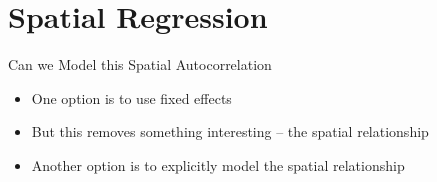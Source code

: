 \documentclass[aspectratio = 169, 12pt]{beamer}\usepackage[]{graphicx}\usepackage[]{color}
\begin{document}
\section{Spatial Regression}
% 
% 
\begin{frame}{Can we Model this Spatial Autocorrelation}
\begin{itemize}
\item One option is to use fixed effects
\item But this removes something interesting -- the spatial relationship
\item Another option is to explicitly model the spatial relationship
\end{itemize}
\end{frame}
\end{document}
